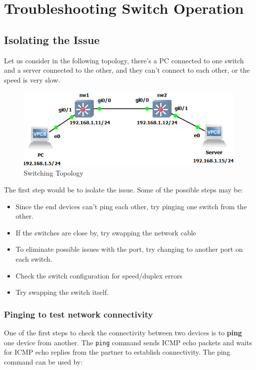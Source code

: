\chapter{Troubleshooting Switch Operation}
\section{Isolating the Issue}
Let us consider in the following topology, there's a PC connected to one switch and a server connected to the other, and they can't connect to each other, or the speed is very slow. 

\begin{figure}[H]
\centering
\includegraphics[width=0.7\linewidth]{"ICND1/1. Switches/chapters/4.1.a Switching topology"}
\caption{Switching Topology}
\label{fig:4.1.a}
\end{figure}
\vspace{-10pt}

\noindent
The first step would be to isolate the issue. Some of the possible steps may be: 
\vspace{-10pt}
\begin{itemize}
\item Since the end devices can't ping each other, try pinging one switch from the other.
\item If the switches are close by, try swapping the network cable
\item To eliminate possible issues with the port, try changing to another port on each switch.
\item Check the switch configuration for speed/duplex errors
\item Try swapping the switch itself.
\end{itemize}

\noindent
\subsection{Pinging to test network connectivity}
One of the first steps to check the connectivity between two devices is to \textbf{ping} one device from another. The \verb|ping| command sends ICMP echo packets and waits for ICMP echo replies from the partner to establish connectivity. The ping command can be used by:

